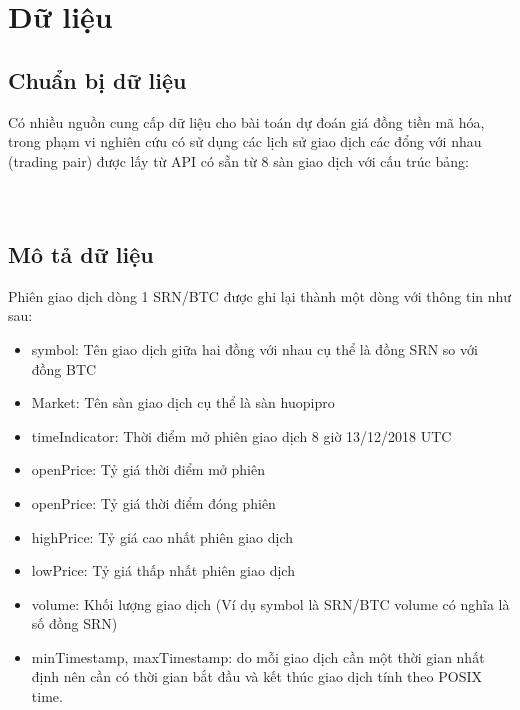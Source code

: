\chapter{Dữ liệu}

\section{Chuẩn bị dữ liệu}
Có nhiều nguồn cung cấp dữ liệu cho bài toán dự đoán giá đồng tiền mã hóa, trong phạm vi nghiên cứu có sử dụng các lịch sử giao dịch các đổng với nhau (trading pair) được lấy từ  API có sẵn từ 8 sàn giao dịch với cấu trúc bảng:\\ %
\\\\

\section{Mô tả dữ liệu}

Phiên giao dịch dòng 1 SRN/BTC được ghi lại thành một dòng với thông tin như sau:\\
 
\begin{itemize}
	\item symbol: Tên giao dịch giữa hai đồng với nhau cụ thể là đồng SRN so với đồng BTC
	\item Market: Tên sàn giao dịch cụ thể là sàn huopipro
	\item timeIndicator: Thời điểm mở phiên giao dịch 8 giờ 13/12/2018 UTC
	\item openPrice: Tỷ giá thời điểm mở phiên
	\item openPrice: Tỷ giá thời điểm đóng phiên
	\item highPrice: Tỷ giá cao nhất phiên giao dịch
	\item lowPrice: Tỷ giá thấp nhất phiên giao dịch
	\item volume: Khối lượng giao dịch (Ví dụ symbol là SRN/BTC volume có nghĩa là số đồng SRN)
	\item minTimestamp, maxTimestamp: do mỗi giao dịch cần một thời gian nhất định nên cần có thời gian bắt đầu và kết thúc giao dịch tính theo POSIX time.
\end{itemize}
